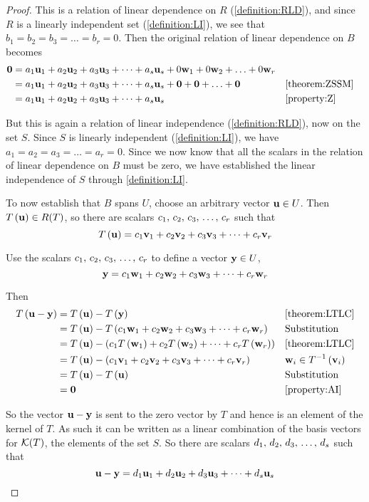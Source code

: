 \documentclass{ximera}
\begin{document}
\begin{theorem}
\begin{proof}
This is a relation of linear dependence on $R$ (\ref{definition:RLD}), and since $R$ is a linearly independent set (\ref{definition:LI}), we see that $b_1=b_2=b_3=\ldots=b_r=0$.  Then the original relation of linear dependence on $B$ becomes
\begin{align*}
\mathbf{0}&=a_{1}\mathbf{u}_{1}+a_{2}\mathbf{u}_{2}+a_{3}\mathbf{u}_{3}+\cdots +a_{s}\mathbf{u}_{s}+0\mathbf{w}_1+0\mathbf{w}_2+\ldots+0\mathbf{w}_r\\
&=a_{1}\mathbf{u}_{1}+a_{2}\mathbf{u}_{2}+a_{3}\mathbf{u}_{3}+\cdots +a_{s}\mathbf{u}_{s}+\mathbf{0}+\mathbf{0}+\ldots+\mathbf{0}&&\ref{theorem:ZSSM}\\
&=a_{1}\mathbf{u}_{1}+a_{2}\mathbf{u}_{2}+a_{3}\mathbf{u}_{3}+\cdots +a_{s}\mathbf{u}_{s}&&\ref{property:Z}
\end{align*}




But this is again a relation of linear independence (\ref{definition:RLD}), now on the set $S$.  Since $S$ is linearly independent (\ref{definition:LI}), we have $a_1=a_2=a_3=\ldots=a_r=0$.  Since we now know that all the scalars in the relation of linear dependence on $B$ must be zero, we have established the linear independence of $S$ through \ref{definition:LI}.



To now establish that $B$ spans $U$, choose an arbitrary vector $\mathbf{u}\in U$.  Then $T\left(\mathbf{u}\right)\in R(T)$, so there are scalars ${c}_{1},\,{c}_{2},\,{c}_{3},\,\ldots,\,{c}_{r}$ such that
\[
T\left(\mathbf{u}\right)=c_{1}\mathbf{v}_{1}+c_{2}\mathbf{v}_{2}+c_{3}\mathbf{v}_{3}+\cdots +c_{r}\mathbf{v}_{r}
\]




Use the scalars ${c}_{1},\,{c}_{2},\,{c}_{3},\,\ldots,\,{c}_{r}$ to define a vector $\mathbf{y}\in U$,
\[
\mathbf{y}=c_{1}\mathbf{w}_{1}+c_{2}\mathbf{w}_{2}+c_{3}\mathbf{w}_{3}+\cdots +c_{r}\mathbf{w}_{r}
\]




Then
\begin{align*}
T\left(\mathbf{u}-\mathbf{y}\right)&=T\left(\mathbf{u}\right)-T\left(\mathbf{y}\right)&&\ref{theorem:LTLC}\\
&=T\left(\mathbf{u}\right)-T\left(c_{1}\mathbf{w}_{1}+c_{2}\mathbf{w}_{2}+c_{3}\mathbf{w}_{3}+\cdots +c_{r}\mathbf{w}_{r}\right)&&\text{Substitution}\\
&=T\left(\mathbf{u}\right)-\left(c_1T\left(\mathbf{w}_1\right)+c_2T\left(\mathbf{w}_2\right)+\cdots+c_rT\left(\mathbf{w}_r\right)\right)&&\ref{theorem:LTLC}\\
&=T\left(\mathbf{u}\right)-\left(c_{1}\mathbf{v}_{1}+c_{2}\mathbf{v}_{2}+c_{3}\mathbf{v}_{3}+\cdots +c_{r}\mathbf{v}_{r}\right)&&\mathbf{w}_i\in T^{-1}\left(\mathbf{v}_i\right)\\
&=T\left(\mathbf{u}\right)-T\left(\mathbf{u}\right)&&\text{Substitution}\\
&=\mathbf{0}&&\ref{property:AI}
\end{align*}




So the vector $\mathbf{u}-\mathbf{y}$ is sent to the zero vector by $T$ and hence is an element of the kernel of $T$.  As such it can be written as a linear combination of the basis vectors for $\mathcal{K}\!\left(T\right)$, the elements of the set $S$.  So there are scalars ${d}_{1},\,{d}_{2},\,{d}_{3},\,\ldots,\,{d}_{s}$ such that
\[
\mathbf{u}-\mathbf{y}=d_{1}\mathbf{u}_{1}+d_{2}\mathbf{u}_{2}+d_{3}\mathbf{u}_{3}+\cdots +d_{s}\mathbf{u}_{s}
\]





\end{proof}
\end{theorem}
\end{document}
